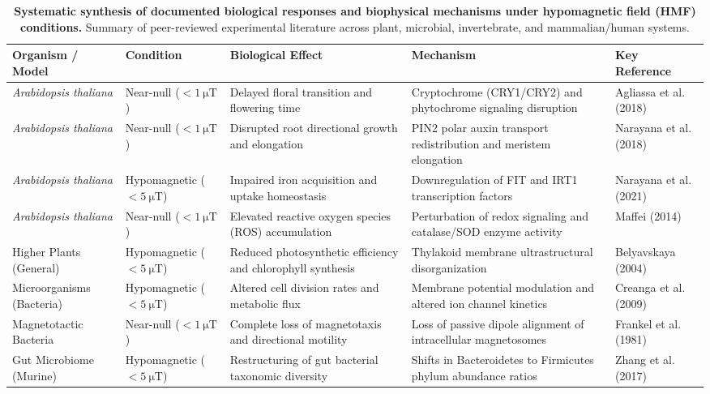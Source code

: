 \begin{table}[t]
\centering
\footnotesize
\caption{\textbf{Systematic synthesis of documented biological responses and biophysical mechanisms under hypomagnetic field (HMF) conditions.} Summary of peer-reviewed experimental literature across plant, microbial, invertebrate, and mammalian/human systems.}
\label{tab:unified_biology_literature}
\begin{tabular}{p{2.8cm}p{2.2cm}p{3.4cm}p{4.4cm}p{3.0cm}}
\toprule
\textbf{Organism / Model} & \textbf{Condition} & \textbf{Biological Effect} & \textbf{Mechanism} & \textbf{Key Reference} \\
\midrule
\textit{Arabidopsis thaliana} & Near-null ($<\SI{1}{\micro\tesla}$) & Delayed floral transition and flowering time & Cryptochrome (CRY1/CRY2) and phytochrome signaling disruption & Agliassa et al. (2018) \citep{Agliassa2018} \\
\textit{Arabidopsis thaliana} & Near-null ($<\SI{1}{\micro\tesla}$) & Disrupted root directional growth and elongation & PIN2 polar auxin transport redistribution and meristem elongation & Narayana et al. (2018) \citep{Narayana2018} \\
\textit{Arabidopsis thaliana} & Hypomagnetic ($<\SI{5}{\micro\tesla}$) & Impaired iron acquisition and uptake homeostasis & Downregulation of FIT and IRT1 transcription factors & Narayana et al. (2021) \citep{Narayana2021} \\
\textit{Arabidopsis thaliana} & Near-null ($<\SI{1}{\micro\tesla}$) & Elevated reactive oxygen species (ROS) accumulation & Perturbation of redox signaling and catalase/SOD enzyme activity & Maffei (2014) \citep{Maffei2014} \\
Higher Plants (General) & Hypomagnetic ($<\SI{5}{\micro\tesla}$) & Reduced photosynthetic efficiency and chlorophyll synthesis & Thylakoid membrane ultrastructural disorganization & Belyavskaya (2004) \citep{Belyavskaya2004} \\
Microorganisms (Bacteria) & Hypomagnetic ($<\SI{5}{\micro\tesla}$) & Altered cell division rates and metabolic flux & Membrane potential modulation and altered ion channel kinetics & Creanga et al. (2009) \citep{Creanga2009} \\
Magnetotactic Bacteria & Near-null ($<\SI{1}{\micro\tesla}$) & Complete loss of magnetotaxis and directional motility & Loss of passive dipole alignment of intracellular magnetosomes & Frankel et al. (1981) \citep{Frankel1981} \\
Gut Microbiome (Murine) & Hypomagnetic ($<\SI{5}{\micro\tesla}$) & Restructuring of gut bacterial taxonomic diversity & Shifts in Bacteroidetes to Firmicutes phylum abundance ratios & Zhang et al. (2017) \citep{Zhang2017} \\

\end{tabular}
\end{table}
